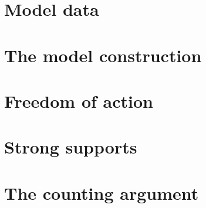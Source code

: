 \documentclass{book}
\begin{document}
\minitoc





\chapter{Model data}

\minitoc









\chapter{The model construction}

\minitoc




\chapter{Freedom of action}

\minitoc












\chapter{Strong supports}

\minitoc







\chapter{The counting argument}
\end{document}
